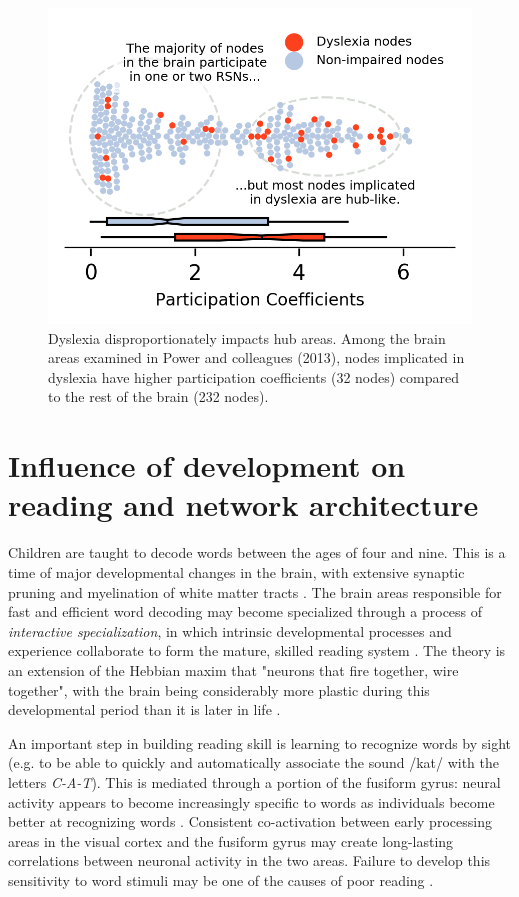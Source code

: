 \begin{figure}[h!]
\centering
\includegraphics[width=5in]{images/ch1-dyslexia-hubs.png}
    \caption[Dyslexia disproportionately impacts hub areas.]{Dyslexia disproportionately impacts hub areas. Among the brain areas examined in Power and colleagues (2013), nodes implicated in dyslexia have higher participation coefficients (32 nodes) compared to the rest of the brain (232 nodes).}
\label{fig:texlogo}
\end{figure}


\section{Influence of development on reading and network architecture}

Children are taught to decode words between the ages of four and nine. This is a time of major developmental changes in the brain, with extensive synaptic pruning and myelination of white matter tracts \cite{Wandell2013}. The brain areas responsible for fast and efficient word decoding may become specialized through a process of \textit{interactive specialization}, in which intrinsic developmental processes and experience collaborate to form the mature, skilled reading system \cite{Johnson2011, Klingberg2014}. The theory is an extension of the Hebbian maxim that "neurons that fire together, wire together", with the brain being considerably more plastic during this developmental period than it is later in life \cite{Hebb1949}.

An important step in building reading skill is learning to recognize words by sight (e.g. to be able to quickly and automatically associate the sound /kat/ with the letters \textit{C-A-T}). This is mediated through a portion of the fusiform gyrus: neural activity appears to become increasingly specific to words as individuals become better at recognizing words \cite{Mccandliss2003, Schlaggar2007}. Consistent co-activation between early processing areas in the visual cortex and the fusiform gyrus may create long-lasting correlations between neuronal activity in the two areas. Failure to develop this sensitivity to word stimuli may be one of the causes of poor reading \cite{He2013}.  

